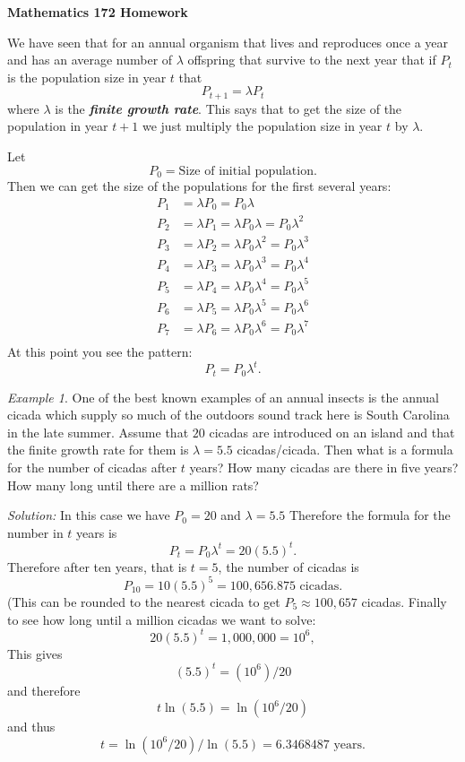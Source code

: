 \documentclass[11pt]{amsart}
\title[]{}
\newcommand{\bi}[1]{{\bf\itshape #1\/}}  %
\renewcommand{\(}{\left(}
\renewcommand{\)}{\right)}
\renewcommand{\[}{\left[}
\renewcommand{\]}{\right]}
\theoremstyle{definition}
\theoremstyle{remark}
\newtheorem{example}[thm]{Example}
\newcommand{\sol}{\smallskip \emph{Solution:  }}
\begin{document}
 

\thispagestyle{empty}


\centerline{\Large\bf Mathematics 172 Homework}\bigskip

We have seen that for an annual  organism that lives and reproduces once a year
and has an average number of $\lambda$ offspring that survive to the next year 
that if $P_t$ is the population size in year $t$ that
$$
P_{t+1} = \lambda P_t
$$
where $\lambda$ is the \bi{finite growth rate}.  This says that
to get the size of the population in year $t+1$ we just multiply
the population size in year $t$ by $\lambda $.

Let 
$$
P_0 = \text{Size of initial population.}
$$
Then we can get the size of the populations for the first several years:
\begin{align*}
P_1 &=\lambda P_0 = P_0 \lambda\\
P_2 &= \lambda P_1 = \lambda P_0\lambda = P_0 \lambda^2\\
P_3 &= \lambda P_2 = \lambda P_0\lambda^2 = P_0 \lambda^3\\
P_4 &= \lambda P_3 = \lambda P_0\lambda^3 = P_0 \lambda^4\\
P_5 &= \lambda P_4 = \lambda P_0\lambda^4 = P_0 \lambda^5\\
P_6 &= \lambda P_5 = \lambda P_0\lambda^5 = P_0 \lambda^6\\
P_7 &= \lambda P_6 = \lambda P_0\lambda^6 = P_0 \lambda^7\\ 
\end{align*}
At this point you see the pattern:
$$
P_t= P_0 \lambda^t.
$$

\begin{example}
One of the best known examples of an annual insects is the annual 
cicada which supply so much of the outdoors sound track
here is South Carolina in the late summer.
Assume that $20$ 
cicadas are introduced on an island and that the 
finite growth rate for them is $\lambda = 5.5$ cicadas/cicada.
Then what is a formula for the number of cicadas after $t$ years?
How many cicadas are there in five years?  How many long until there
are a million rats?  
\end{example}

\sol In this case we have $P_0= 20$ and 
$\lambda = 5.5$  Therefore the formula 
for the number in $t$ years is
$$
P_t = P_0 \lambda^t = 20 (5.5)^t.
$$
Therefore after ten years, that is $t=5$, the number of cicadas is
$$
P_{10}= 10(5.5)^{5} = 100{,}656.875\text{ cicadas}.
$$
(This can be rounded to the nearest cicada to get $P_5 \approx  100{,}657$ 
cicadas.
Finally to see how long until a million cicadas we want to solve:
$$
20(5.5)^t = 1{,}000{,}000 = 10^6,
$$
This gives
$$
(5.5)^t = (10^6)/20
$$
and therefore
$$
t \ln(5.5) = \ln\( 10^6/20\)
$$
and thus
$$
t = \ln\( 10^6/20\)/  \ln(5.5) = 6.3468487 \text{ years.}
$$
\end{document}
